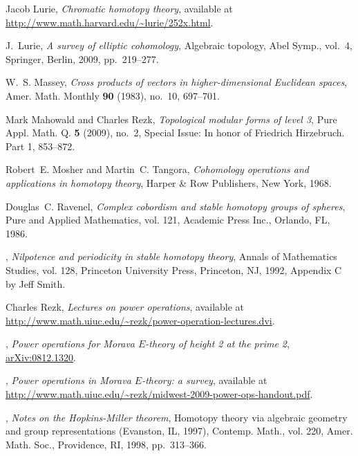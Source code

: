 \documentclass{gtpart}
\theoremstyle{definition}
\theoremstyle{remark}
\begin{document}
\begin{thebibliography}
Jacob Lurie, \emph{Chromatic homotopy theory}, available at
  \url{http://www.math.harvard.edu/~lurie/252x.html}.

J.~Lurie, \emph{A survey of elliptic cohomology}, Algebraic topology, Abel
  Symp., vol.~4, Springer, Berlin, 2009, pp.~219--277. 

W.~S. Massey, \emph{Cross products of vectors in higher-dimensional {E}uclidean
  spaces}, Amer. Math. Monthly \textbf{90} (1983), no.~10, 697--701. 

Mark Mahowald and Charles Rezk, \emph{Topological modular forms of level 3},
  Pure Appl. Math. Q. \textbf{5} (2009), no.~2, Special Issue: In honor of
  Friedrich Hirzebruch. Part 1, 853--872. 

Robert~E. Mosher and Martin~C. Tangora, \emph{Cohomology operations and
  applications in homotopy theory}, Harper \& Row Publishers, New York, 1968.

Douglas~C. Ravenel, \emph{Complex cobordism and stable homotopy groups of
  spheres}, Pure and Applied Mathematics, vol. 121, Academic Press Inc.,
  Orlando, FL, 1986. 

\bysame, \emph{Nilpotence and periodicity in stable homotopy theory}, Annals of
  Mathematics Studies, vol. 128, Princeton University Press, Princeton, NJ,
  1992, Appendix C by Jeff Smith. 

Charles Rezk, \emph{Lectures on power operations}, available at
  \url{http://www.math.uiuc.edu/~rezk/power-operation-lectures.dvi}.

\bysame, \emph{Power operations for {M}orava ${E}$-theory of height 2 at the
  prime 2}, \href{http://arxiv.org/abs/0812.1320}{arXiv:0812.1320}.

\bysame, \emph{Power operations in {M}orava ${E}$-theory: a survey}, available
  at \url{http://www.math.uiuc.edu/~rezk/midwest-2009-power-ops-handout.pdf}.

\bysame, \emph{Notes on the {H}opkins-{M}iller theorem}, Homotopy theory via
  algebraic geometry and group representations ({E}vanston, {IL}, 1997),
  Contemp. Math., vol. 220, Amer. Math. Soc., Providence, RI, 1998,
  pp.~313--366. 


\end{thebibliography}
\end{document}

